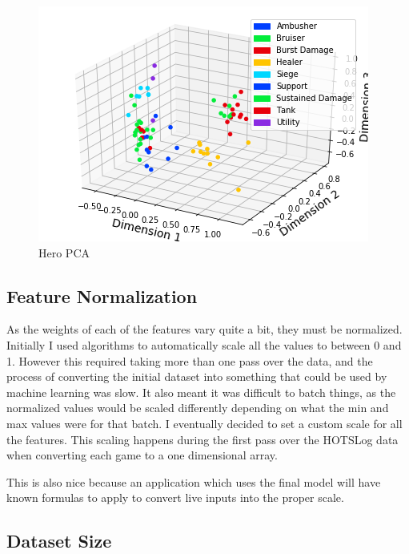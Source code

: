 \documentclass[twoside,twocolumn]{article}
\begin{document}
\begin{figure}
\caption{Hero PCA}
\label{figure:heropca}
\centering
\includegraphics[width=\linewidth]{heropca}
\end{figure}

\subsection{Feature Normalization}

As the weights of each of the features vary quite a bit, they must be normalized.  Initially I used algorithms to automatically scale all the values to between 0 and 1.  However this required taking more than one pass over the data, and the process of converting the initial dataset into something that could be used by machine learning was slow.  It also meant it was difficult to batch things, as the normalized values would be scaled differently depending on what the min and max values were for that batch.  I eventually decided to set a custom scale for all the features.  This scaling happens during the first pass over the HOTSLog data when converting each game to a one dimensional array.

This is also nice because an application which uses the final model will have known formulas to apply to convert live inputs into the proper scale.

\subsection{Dataset Size}
\end{document}
